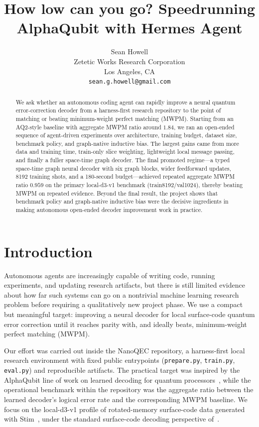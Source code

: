 \documentclass{article}
\title{How low can you go? Speedrunning AlphaQubit with Hermes Agent}
\author{%
  Sean Howell\\
  Zetetic Works Research Corporation\\
  Los Angeles, CA\\
  \texttt{sean.g.howell@gmail.com}
}
\begin{document}
\maketitle

\begin{abstract}
We ask whether an autonomous coding agent can rapidly improve a neural quantum error-correction decoder from a harness-first research repository to the point of matching or beating minimum-weight perfect matching (MWPM). Starting from an AQ2-style baseline with aggregate MWPM ratio around $1.84$, we ran an open-ended sequence of agent-driven experiments over architecture, training budget, dataset size, benchmark policy, and graph-native inductive bias. The largest gains came from more data and training time, train-only slice weighting, lightweight local message passing, and finally a fuller space-time graph decoder. The final promoted regime---a typed space-time graph neural decoder with six graph blocks, wider feedforward updates, 8192 training shots, and a 180-second budget---achieved repeated aggregate MWPM ratio $0.959$ on the primary local-d3-v1 benchmark (train8192/val1024), thereby beating MWPM on repeated evidence. Beyond the final result, the project shows that benchmark policy and graph-native inductive bias were the decisive ingredients in making autonomous open-ended decoder improvement work in practice.
\end{abstract}

\section{Introduction}
Autonomous agents are increasingly capable of writing code, running experiments, and updating research artifacts, but there is still limited evidence about how far such systems can go on a nontrivial machine learning research problem before requiring a qualitatively new project phase. We use a compact but meaningful target: improving a neural decoder for local surface-code quantum error correction until it reaches parity with, and ideally beats, minimum-weight perfect matching (MWPM).

Our effort was carried out inside the NanoQEC repository, a harness-first local research environment with fixed public entrypoints (\texttt{prepare.py}, \texttt{train.py}, \texttt{eval.py}) and reproducible artifacts. The practical target was inspired by the AlphaQubit line of work on learned decoding for quantum processors~\citep{Bausch_2024}, while the operational benchmark within the repository was the aggregate ratio between the learned decoder's logical error rate and the corresponding MWPM baseline. We focus on the local-d3-v1 profile of rotated-memory surface-code data generated with Stim~\citep{Gidney_2021}, under the standard surface-code decoding perspective of~\citet{Fowler_2012}.
\end{document}
